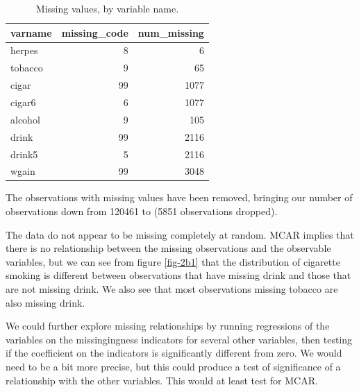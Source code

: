 \documentclass[12pt]{article}
\begin{document}
\begin{table}[ht]
\centering
\caption{Missing values, by variable name.} 
\begin{tabular}{lrr}
  \hline
varname & missing\_code & num\_missing \\ 
  \hline
herpes &   8 &   6 \\ 
  tobacco &   9 &  65 \\ 
  cigar &  99 & 1077 \\ 
  cigar6 &   6 & 1077 \\ 
  alcohol &   9 & 105 \\ 
  drink &  99 & 2116 \\ 
  drink5 &   5 & 2116 \\ 
  wgain &  99 & 3048 \\ 
   \hline
\end{tabular}
\end{table}

The observations with missing values have been removed, bringing our number of observations down from 120461 to  (5851 observations dropped).

\vem
{}

The data do not appear to be missing completely at random. MCAR implies that there is no relationship between the missing observations and the observable variables, but we can see from figure \ref{fig-2b1} that the distribution of cigarette smoking is different between observations that have missing drink and those that are not missing drink. We also see that most observations missing tobacco are also missing drink.

We could further explore missing relationships by running regressions of the variables on the missingingness indicators for several other variables, then testing if the coefficient on the indicators is significantly different from zero. We would need to be a bit more precise, but this could produce a test of significance of a relationship with the other variables. This would at least test for MCAR. 
\end{document}
